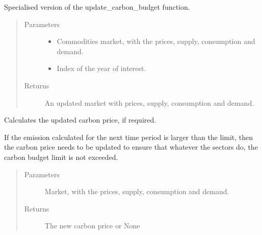 \documentclass[letterpaper,10pt,english]{sphinxmanual}
\begin{document}
\begin{fulllineitems}
\begin{fulllineitems}
\label{\detokenize{api:muse.mca.MCA.update_carbon_budget}}
Specialised version of the update\_carbon\_budget function.
\begin{quote}\begin{description}
\item[{Parameters}] \leavevmode\begin{itemize}
\item {} 
 \textendash{} Commodities market, with the prices, supply, consumption and demand.

\item {} 
 \textendash{} Index of the year of interest.

\end{itemize}

\item[{Returns}] \leavevmode
An updated market with prices, supply, consumption and demand.

\end{description}\end{quote}

\end{fulllineitems}


\begin{fulllineitems}
\label{\detokenize{api:muse.mca.MCA.update_carbon_price}}
Calculates the updated carbon price, if required.

If the emission calculated for the next time period is larger than the
limit, then the carbon price needs to be updated to ensure that whatever the
sectors do, the carbon budget limit is not exceeded.
\begin{quote}\begin{description}
\item[{Parameters}] \leavevmode
{} \textendash{} Market, with the prices, supply, consumption and demand.

\item[{Returns}] \leavevmode
The new carbon price or None

\end{description}\end{quote}

\end{fulllineitems}


\end{fulllineitems}
\end{document}

